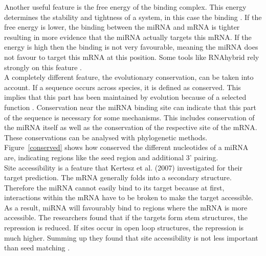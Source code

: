\documentclass[11pt, a4paper, oneside]{book}
\begin{document}
Another useful feature is the free energy of the binding complex. This energy determines the stability and tightness of a  system, in this case the binding \cite{Peterson}. If the free energy is lower, the binding between the miRNA and mRNA is tighter resulting in more evidence that the miRNA actually targets this mRNA. If the energy is high then the binding is not very favourable, meaning the miRNA does not favour to target this mRNA at this position. Some tools like RNAhybrid rely strongly on this feature \cite{Rehmsmeier}. \\

A completely different feature, the evolutionary conservation, can be taken into account. If a sequence occurs across species, it is defined as conserved. This implies that this part has been maintained by evolution because of a selected function \cite{Peterson}. Conservation near the miRNA binding site can indicate that this part of the sequence is necessary for some mechanisms. This includes conservation of the miRNA itself as well as the conservation of the respective site of the mRNA. These conservations can be analysed with phylogenetic methods. Figure~\ref{conserved} shows how conserved the different nucleotides of a miRNA are, indicating regions like the seed region and additional 3' pairing. \\

Site accessibility is a feature that Kertesz et al. (2007) investigated for their target prediction. The mRNA generally folds into a secondary structure. Therefore the miRNA cannot easily bind to its target because at first, interactions within the mRNA have to be broken to make the target accessible. As a result, miRNA will favourably bind to regions where the mRNA is more accessible. The researchers found that if the targets form stem structures, the repression is reduced. If sites occur in open loop structures, the repression is much higher. Summing up they found that site accessibility is not less important than seed matching \cite{Kertesz}. \\
\end{document}
